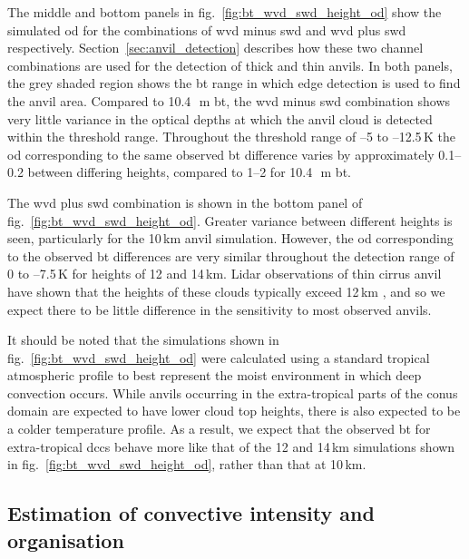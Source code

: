The middle and bottom panels in fig.~\ref{fig:bt_wvd_swd_height_od} show the simulated \acrshort{od} for the combinations of \acrshort{wvd} minus \acrshort{swd} and \acrshort{wvd} plus \acrshort{swd} respectively.
Section~\ref{sec:anvil_detection} describes how these two channel combinations are used for the detection of thick and thin anvils.
In both panels, the grey shaded region shows the \acrshort{bt} range in which edge detection is used to find the anvil area.
Compared to 10.4\,\unit{\mu m} \acrshort{bt}, the \acrshort{wvd} minus \acrshort{swd} combination shows very little variance in the optical depths at which the anvil cloud is detected within the threshold range.
Throughout the threshold range of --5 to --12.5\,\unit{K} the \acrshort{od} corresponding to the same observed \acrshort{bt} difference varies by approximately 0.1--0.2 between differing heights, compared to 1--2 for 10.4\,\unit{\mu m} \acrshort{bt}.

The \acrshort{wvd} plus \acrshort{swd} combination is shown in the bottom panel of fig.~\ref{fig:bt_wvd_swd_height_od}.
Greater variance between different heights is seen, particularly for the 10\,\unit{km} anvil simulation.
However, the \acrshort{od} corresponding to the observed \acrshort{bt} differences are very similar throughout the detection range of 0 to --7.5\,\unit{K} for heights of 12 and 14\,\unit{km}.
Lidar observations of thin cirrus anvil have shown that the heights of these clouds typically exceed 12\,\unit{km} \citep{wall_observational_2020, horner_evolution_2023}, and so we expect there to be little difference in the sensitivity to most observed anvils.

It should be noted that the simulations shown in fig.~\ref{fig:bt_wvd_swd_height_od} were calculated using a standard tropical atmospheric profile to best represent the moist environment in which deep convection occurs.
While anvils occurring in the extra-tropical parts of the \acrshort{conus} domain are expected to have lower cloud top heights, there is also expected to be a colder temperature profile.
As a result, we expect that the observed \acrshort{bt} for extra-tropical \acrshort{dcc}s behave more like that of the 12 and 14\,\unit{km} simulations shown in fig.~\ref{fig:bt_wvd_swd_height_od}, rather than that at 10\,\unit{km}.


\subsection{Estimation of convective intensity and organisation} \label{sec:method_proxies}

